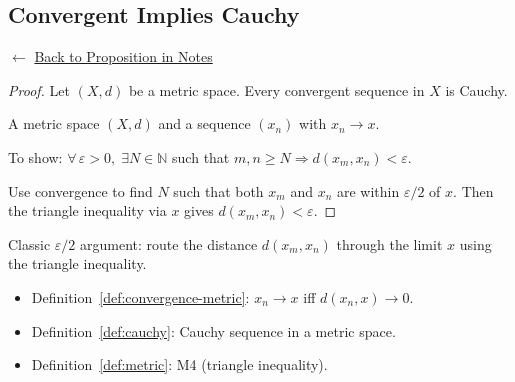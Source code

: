
\subsection*{Convergent Implies Cauchy}
\label{prf:convergent-implies-cauchy}

\begin{remark*}[Return]
$\leftarrow$ \hyperref[prop:convergent-implies-cauchy]{Back to Proposition in Notes}
\end{remark*}

\begin{proof}
\Claim Let $(X,d)$ be a metric space.
Every convergent sequence in $X$ is Cauchy.

\Given A metric space $(X,d)$ and a sequence $(x_n)$ with $x_n \to x$.

\Goal To show: $\forall\, \varepsilon > 0,\; \exists N \in \mathbb{N}$ such that
$m, n \ge N \Rightarrow d(x_m, x_n) < \varepsilon$.

\Strategy Use convergence to find $N$ such that both $x_m$ and $x_n$
are within $\varepsilon/2$ of $x$. Then the triangle inequality via $x$
gives $d(x_m, x_n) < \varepsilon$.


\end{proof}

\begin{remark*}
Classic $\varepsilon/2$ argument: route the distance $d(x_m, x_n)$ through
the limit $x$ using the triangle inequality.
\end{remark*}

\begin{remark*}[Dependencies]
\begin{itemize}
  \item Definition~\ref{def:convergence-metric}: $x_n \to x$ iff $d(x_n,x) \to 0$.
  \item Definition~\ref{def:cauchy}: Cauchy sequence in a metric space.
  \item Definition~\ref{def:metric}: M4 (triangle inequality).
\end{itemize}
\end{remark*}
